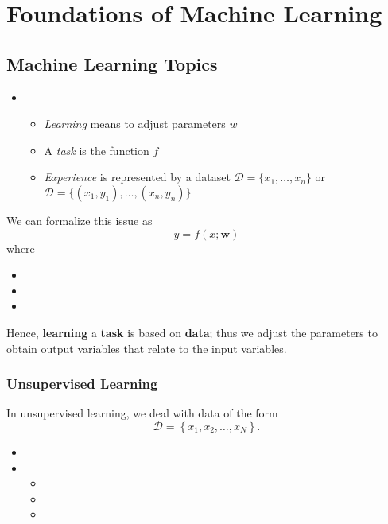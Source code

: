 \chapter{Foundations of Machine Learning}
%
%
%
\section{Machine Learning Topics}
%
%
%
\begin{itemize}
	\item{}%
		\begin{itemize}
			\item \emph{Learning} means to adjust parameters $w$
			\item A \emph{task} is the function $f$
			\item \emph{Experience} is represented by a dataset $\mathcal{D} = \{x_1,\ldots,x_n\}$ or $\mathcal{D} = \{(x_1,y_1),\ldots,(x_n,y_n)\}$
		\end{itemize}
\end{itemize}
We can formalize this issue as \begin{equation}
	y = f(x;\mathbf{w})
	\label{eq:goal_ml}
\end{equation} where %
\begin{itemize}
	\item{}%
	\item{}%
	\item{}%
\end{itemize}
Hence, \textbf{learning} a \textbf{task} is based on \textbf{data}; thus we adjust the parameters to obtain output variables that relate to the input variables. %
%
%
%
\subsection{Unsupervised Learning}
In unsupervised learning, we deal with data of the form %
\begin{equation}
\mathcal{D} = \left\{ x_1,x_2, \ldots, x_N \right\}.
\label{eq:unsupervised_train_set}
\end{equation}
\begin{itemize}
	\item{}
	\item{}%
	\begin{itemize}
		\item{}
		\item{}
		\item{}
	\end{itemize}
\end{itemize}
%
%
%
